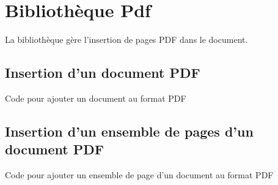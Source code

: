 \chapter{Bibliothèque Pdf}

La bibliothèque  gère l'insertion de pages PDF dans le document.

\section{Insertion d'un document PDF}

\begin{Latex}{Code pour ajouter un document au format PDF}

\end{Latex}

\section{Insertion d'un ensemble de pages d'un document PDF}

\begin{Latex}{Code pour ajouter un ensemble de page d'un document au format PDF}

\end{Latex}

